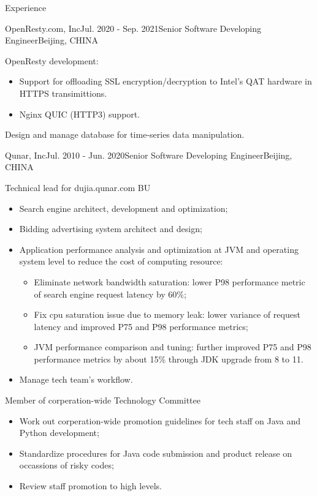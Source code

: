 \documentclass{resume} %
\begin{document}
\begin{rSection}{Experience}

  \begin{rSubsection}{OpenResty.com, Inc}{Jul. 2020 - Sep. 2021}{Senior Software Developing Engineer}{Beijing, CHINA}
  \item OpenResty development:
    \begin {itemize}
    \item Support for offloading SSL encryption/decryption to Intel's QAT hardware in HTTPS transimittions.
    \item Nginx QUIC (HTTP3) support.
    \end{itemize}
  \item Design and manage database for time-series data manipulation.
  \end{rSubsection}
  
  \begin{rSubsection}{Qunar, Inc}{Jul. 2010 - Jun. 2020}{Senior Software Developing Engineer}{Beijing, CHINA}
  \item Technical lead for dujia.qunar.com BU
    \begin{itemize}
    \item Search engine architect, development and optimization;
    \item Bidding advertising system architect and design;
    \item {
        Application performance analysis and optimization at JVM and operating system level to reduce the cost of computing resource:
        \begin{itemize}
        \item { Eliminate network bandwidth saturation: lower P98 performance metric of search engine request latency by 60\%; }
        \item { Fix cpu saturation issue due to memory leak: lower variance of request latency and improved P75 and P98 performance metrics; }
        \item { JVM performance comparison and tuning: further improved P75 and P98 performance metrics by about 15\% through JDK upgrade from 8 to 11. }
        \end{itemize}
      }
    \item Manage tech team's workflow.
    \end{itemize}
  \item Member of corperation-wide Technology Committee
    \begin{itemize}
    \item Work out corperation-wide promotion guidelines for tech staff on Java and Python development;
    \item Standardize procedures for Java code submission and product release on occassions of risky codes;
    \item Review staff promotion to high levels.
    \end{itemize}
  

\end{rSubsection}
\end{rSection}
\end{document}

